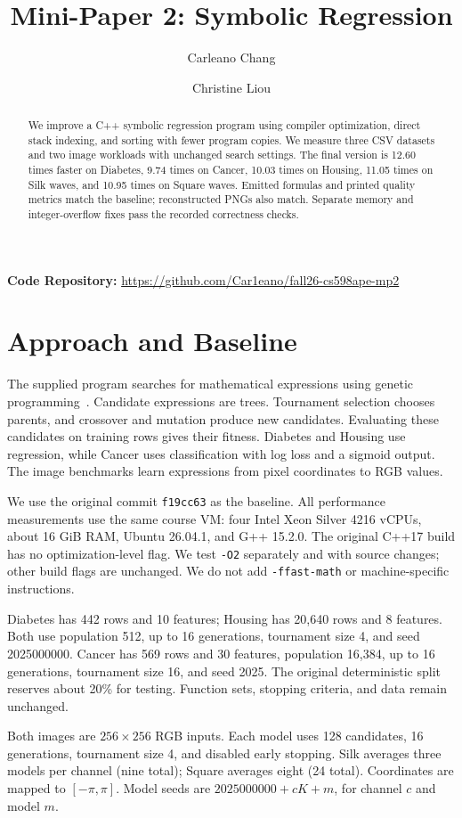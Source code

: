 \documentclass[sigplan,nonacm]{acmart}
\title{Mini-Paper 2: Symbolic Regression}
\author{Carleano Chang}
\affiliation{\institution{University of Illinois Urbana-Champaign}\city{Urbana}\state{Illinois}\country{USA}}
\author{Christine Liou}
\affiliation{\institution{University of Illinois Urbana-Champaign}\city{Urbana}\state{Illinois}\country{USA}}
\begin{document}
\begin{abstract}
We improve a C++ symbolic regression program using compiler optimization, direct stack indexing, and sorting with fewer program copies. We measure three CSV datasets and two image workloads with unchanged search settings. The final version is 12.60 times faster on Diabetes, 9.74 times on Cancer, 10.03 times on Housing, 11.05 times on Silk waves, and 10.95 times on Square waves. Emitted formulas and printed quality metrics match the baseline; reconstructed PNGs also match. Separate memory and integer-overflow fixes pass the recorded correctness checks.
\end{abstract}
\maketitle
\noindent\textbf{Code Repository:} \url{https://github.com/Car1eano/fall26-cs598ape-mp2}

\section{Approach and Baseline}
The supplied program searches for mathematical expressions using genetic programming~\cite{starter}. Candidate expressions are trees. Tournament selection chooses parents, and crossover and mutation produce new candidates. Evaluating these candidates on training rows gives their fitness. Diabetes and Housing use regression, while Cancer uses classification with log loss and a sigmoid output. The image benchmarks learn expressions from pixel coordinates to RGB values.

We use the original commit \texttt{f19cc63} as the baseline. All performance measurements use the same course VM: four Intel Xeon Silver 4216 vCPUs, about 16 GiB RAM, Ubuntu 26.04.1, and G++ 15.2.0. The original C++17 build has no optimization-level flag. We test \texttt{-O2} separately and with source changes; other build flags are unchanged. We do not add \texttt{-ffast-math} or machine-specific instructions.

Diabetes has 442 rows and 10 features; Housing has 20,640 rows and 8 features. Both use population 512, up to 16 generations, tournament size 4, and seed 2025000000. Cancer has 569 rows and 30 features, population 16,384, up to 16 generations, tournament size 16, and seed 2025. The original deterministic split reserves about 20\% for testing. Function sets, stopping criteria, and data remain unchanged.

Both images are $256\times256$ RGB inputs. Each model uses 128 candidates, 16 generations, tournament size 4, and disabled early stopping. Silk averages three models per channel (nine total); Square averages eight (24 total). Coordinates are mapped to $[-\pi,\pi]$. Model seeds are $2025000000+cK+m$, for channel $c$ and model $m$.
\end{document}
